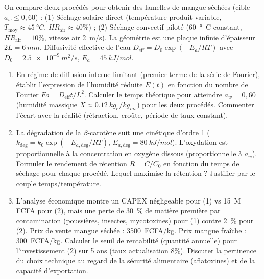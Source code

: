 \documentclass[11pt]{article}
\begin{document}
\begin{exercice}
On compare deux procédés pour obtenir des lamelles de mangue séchées (cible $a_w \le 0,60$) : (1) Séchage solaire direct (température produit variable, $T_{\text{moy}} \approx \SI{45}{°C}$, $HR_{\text{air}} \approx 40\%$) ; (2) Séchage convectif piloté (\SI{60}{°C} constant, $HR_{\text{air}} = 10\%$, vitesse air \SI{2}{m/s}). La géométrie est une plaque infinie d'épaisseur $2L = \SI{6}{mm}$. Diffusivité effective de l'eau $D_{\text{eff}} = D_0 \exp(-E_a/RT)$ avec $D_0 = \SI{2,5e-9}{m^2/s}$, $E_a = \SI{45}{kJ/mol}$.
\begin{enumerate}
    \item En régime de diffusion interne limitant (premier terme de la série de Fourier), établir l'expression de l'humidité réduite $E(t)$ en fonction du nombre de Fourier $Fo = D_{\text{eff}} t / L^2$. Calculer le temps théorique pour atteindre $a_w = 0,60$ (humidité massique $X \approx \SI{0,12}{kg_e/kg_{ms}}$) pour les deux procédés. Commenter l'écart avec la réalité (rétraction, croûte, période de taux constant).
    \item La dégradation de la $\beta$-carotène suit une cinétique d'ordre 1 ($k_{\text{deg}} = k_0 \exp(-E_{a,\text{deg}}/RT)$, $E_{a,\text{deg}} = \SI{80}{kJ/mol}$). L'oxydation est proportionnelle à la concentration en oxygène dissous (proportionnelle à $a_w$). Formuler le rendement de rétention $R = C/C_0$ en fonction du temps de séchage pour chaque procédé. Lequel maximise la rétention ? Justifier par le couple temps/température.
    \item L'analyse économique montre un CAPEX négligeable pour (1) vs \SI{15}{M} FCFA pour (2), mais une perte de \SI{30}{\%} de matière première par contamination (poussières, insectes, mycotoxines) pour (1) contre \SI{2}{\%} pour (2). Prix de vente mangue séchée : \SI{3500}{FCFA/kg}. Prix mangue fraîche : \SI{300}{FCFA/kg}. Calculer le seuil de rentabilité (quantité annuelle) pour l'investissement (2) sur 5 ans (taux actualisation 8\%). Discuter la pertinence du choix technique au regard de la sécurité alimentaire (aflatoxines) et de la capacité d'exportation.
\end{enumerate}
\end{exercice}
\end{document}
